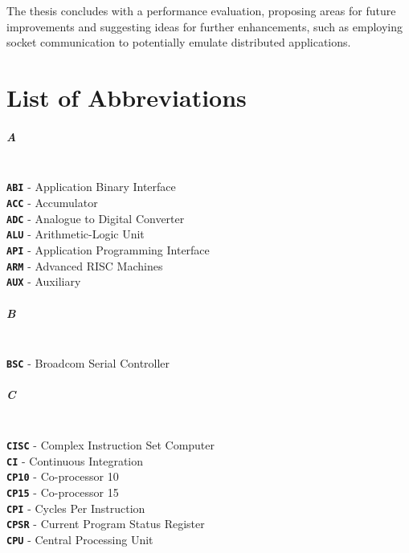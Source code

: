 \documentclass[english, ing, kiv, he, iso690numb, pdf]{fasthesis}
\begin{document}
	The thesis concludes with a performance evaluation, proposing areas for future improvements and suggesting ideas for further enhancements, such as employing socket communication to potentially emulate distributed applications.
	
	\backmatter
	
	\printbibliography
	
	\chapter{List of Abbreviations}
	
	\paragraph{A}
	\\
	\noindent
	\textbf{\texttt{ABI}} - Application Binary Interface \\
	\textbf{\texttt{ACC}} - Accumulator \\
	\textbf{\texttt{ADC}} - Analogue to Digital Converter \\
	\textbf{\texttt{ALU}} - Arithmetic-Logic Unit \\
	\textbf{\texttt{API}} - Application Programming Interface \\
	\textbf{\texttt{ARM}} - Advanced RISC Machines \\
	\textbf{\texttt{AUX}} - Auxiliary \\
	\paragraph{B}
	\\
	\noindent
	\textbf{\texttt{BSC}} - Broadcom Serial Controller \\
	\paragraph{C}
	\\
	\noindent
	\textbf{\texttt{CISC}} - Complex Instruction Set Computer \\
	\textbf{\texttt{CI}}   - Continuous Integration \\
	\textbf{\texttt{CP10}} - Co-processor 10 \\
	\textbf{\texttt{CP15}} - Co-processor 15 \\
	\textbf{\texttt{CPI}}  - Cycles Per Instruction \\
	\textbf{\texttt{CPSR}} - Current Program Status Register \\
	\textbf{\texttt{CPU}}  - Central Processing Unit \\
\end{document}
